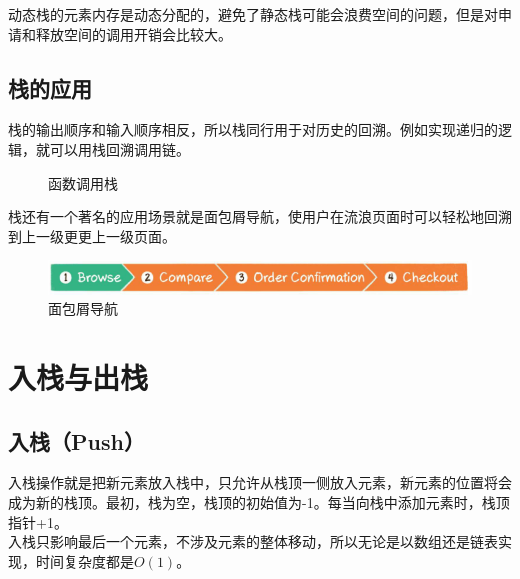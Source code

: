 动态栈的元素内存是动态分配的，避免了静态栈可能会浪费空间的问题，但是对申请和释放空间的调用开销会比较大。

\subsection{栈的应用}

栈的输出顺序和输入顺序相反，所以栈同行用于对历史的回溯。例如实现递归的逻辑，就可以用栈回溯调用链。 \\

\begin{figure}[H]
    \centering
    \begin{drawstack}
        \startframe
        \startframe
        \cell{$ \vdots $}
        \startframe
    \end{drawstack}
    \caption{函数调用栈}
\end{figure}

栈还有一个著名的应用场景就是面包屑导航，使用户在流浪页面时可以轻松地回溯到上一级更更上一级页面。

\begin{figure}[H]
    \centering
    \includegraphics[]{img/C4/4-1/1.png}
    \caption{面包屑导航}
\end{figure}

\newpage

\section{入栈与出栈}

\subsection{入栈（Push）}

入栈操作就是把新元素放入栈中，只允许从栈顶一侧放入元素，新元素的位置将会成为新的栈顶。最初，栈为空，栈顶的初始值为-1。每当向栈中添加元素时，栈顶指针+1。 \\

入栈只影响最后一个元素，不涉及元素的整体移动，所以无论是以数组还是链表实现，时间复杂度都是$ O(1) $。 \\

